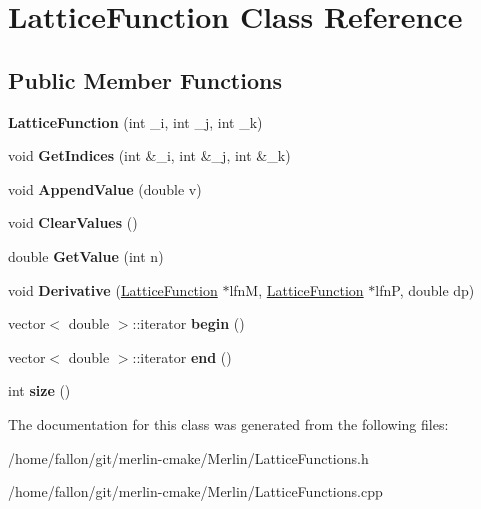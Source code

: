 \hypertarget{classLatticeFunction}{}\section{Lattice\+Function Class Reference}
\label{classLatticeFunction}
\subsection*{Public Member Functions}
\begin{DoxyCompactItemize}
\item 
\mbox{\label{classLatticeFunction_a6e33cfe025ed55e70d6b25314360775a}} 
{\bfseries Lattice\+Function} (int \+\_\+i, int \+\_\+j, int \+\_\+k)
\item 
\mbox{\label{classLatticeFunction_a349e070d795e12143cbbd73bef578021}} 
void {\bfseries Get\+Indices} (int \&\+\_\+i, int \&\+\_\+j, int \&\+\_\+k)
\item 
\mbox{\label{classLatticeFunction_a7760ffc32ff74bf328f8dbe08a60e312}} 
void {\bfseries Append\+Value} (double v)
\item 
\mbox{\label{classLatticeFunction_a0a29f9e9e0e6cbcc0e5223f7fb8ccd5d}} 
void {\bfseries Clear\+Values} ()
\item 
\mbox{\label{classLatticeFunction_a053e7ae8358860754579e6f26518afce}} 
double {\bfseries Get\+Value} (int n)
\item 
\mbox{\label{classLatticeFunction_a454bb966400b44e30aa6fc8d537069a6}} 
void {\bfseries Derivative} (\hyperlink{classLatticeFunction}{Lattice\+Function} $\ast$lfnM, \hyperlink{classLatticeFunction}{Lattice\+Function} $\ast$lfnP, double dp)
\item 
\mbox{\label{classLatticeFunction_a36b72ebc1aab1430747a6bfa7f8af3c2}} 
vector$<$ double $>$\+::iterator {\bfseries begin} ()
\item 
\mbox{\label{classLatticeFunction_a66ac483b110c37f79c719b32bceef948}} 
vector$<$ double $>$\+::iterator {\bfseries end} ()
\item 
\mbox{\label{classLatticeFunction_a84aff9598b47f89f3dcba4f474c9e38f}} 
int {\bfseries size} ()
\end{DoxyCompactItemize}


The documentation for this class was generated from the following files\+:\begin{DoxyCompactItemize}
\item 
/home/fallon/git/merlin-\/cmake/\+Merlin/Lattice\+Functions.\+h\item 
/home/fallon/git/merlin-\/cmake/\+Merlin/Lattice\+Functions.\+cpp\end{DoxyCompactItemize}
